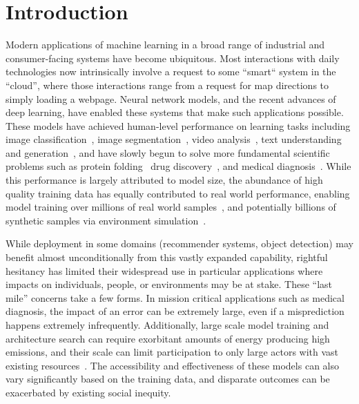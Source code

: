 \chapter{Introduction} \label{chap:intro} 
Modern applications of machine learning in a broad range of industrial and consumer-facing systems have become ubiquitous.
Most interactions with daily technologies now intrinsically involve 
a request to some ``smart`` system in the ``cloud'', 
where those interactions range from
a request for map directions 
to simply loading a webpage.
Neural network models, and the recent advances of deep learning,
have enabled these systems that 
make such applications possible.
These models have achieved
human-level performance on learning tasks
including image classification~\citep{resnet,alexnet}, image segmentation~\citep{segmentation}, video analysis~\citep{zhang2016video}, text understanding and generation~\citep{bert,gpt}, and have slowly begun to solve more fundamental scientific problems such as protein folding~\citep{protein} drug discovery~\citep{drugdisc}, and medical diagnosis~\citep{diag}.
While this performance is largely attributed to model size,
the abundance of high quality training data
has equally contributed to real world performance,
enabling model training over millions of real world samples~\citep{imagenet,laion},
and potentially billions of synthetic samples via environment simulation~\citep{mcts}.

While deployment in some domains (recommender systems, object detection) may benefit almost unconditionally from this vastly expanded capability, rightful hesitancy has limited their widespread use in particular applications where impacts on individuals, people, or environments may be at stake.
These ``last mile'' concerns take a few forms.
In mission critical applications such as medical diagnosis, 
the impact of an error can be extremely large,
even if a misprediction happens extremely infrequently.
Additionally, large scale model training and architecture search
can require exorbitant amounts of energy producing high emissions,
and their scale can limit participation
to only large actors with vast existing resources~\citep{anthony2020carbontracker}.
The accessibility and effectiveness of these models can also vary significantly based on the training data, and disparate outcomes can be exacerbated by existing social inequity.

